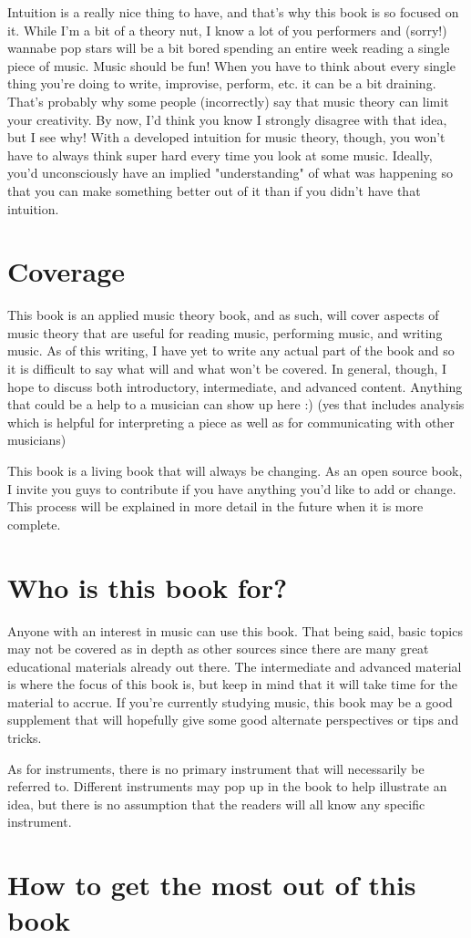 \documentclass[../OpenAppliedMusicTheory.tex]{subfiles}
\begin{document}
    Intuition is a really nice thing to have, and that's why this book is so focused on it. While I'm a bit of a theory nut, I know a lot of you performers and (sorry!) wannabe pop stars will be a bit bored spending an entire week reading a single piece of music. Music should be fun! When you have to think about every single thing you're doing to write, improvise, perform, etc. it can be a bit draining. That's probably why some people (incorrectly) say that music theory can limit your creativity. By now, I'd think you know I strongly disagree with that idea, but I see why! With a developed intuition for music theory, though, you won't have to always think super hard every time you look at some music. Ideally, you'd unconsciously have an implied "understanding" of what was happening so that you can make something better out of it than if you didn't have that intuition.

    \section*{Coverage}
    This book is an applied music theory book, and as such, will cover aspects of music theory that are useful for reading music, performing music, and writing music. As of this writing, I have yet to write any actual part of the book and so it is difficult to say what will and what won't be covered. In general, though, I hope to discuss both introductory, intermediate, and advanced content. Anything that could be a help to a musician can show up here :) (yes that includes analysis which is helpful for interpreting a piece as well as for communicating with other musicians)

    This book is a living book that will always be changing. As an open source book, I invite you guys to contribute if you have anything you'd like to add or change. This process will be explained in more detail in the future when it is more complete.  

    \section*{Who is this book for?}
    Anyone with an interest in music can use this book. That being said, basic topics may not be covered as in depth as other sources since there are many great educational materials already out there. The intermediate and advanced material is where the focus of this book is, but keep in mind that it will take time for the material to accrue. If you're currently studying music, this book may be a good supplement that will hopefully give some good alternate perspectives or tips and tricks.

    As for instruments, there is no primary instrument that will necessarily be referred to. Different instruments may pop up in the book to help illustrate an idea, but there is no assumption that the readers will all know any specific instrument.

    \section*{How to get the most out of this book}
\end{document}
